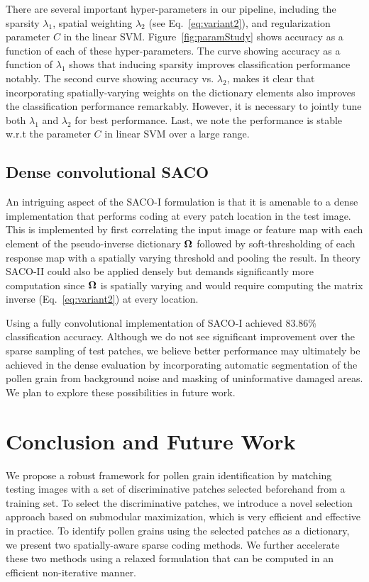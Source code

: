 \documentclass[10pt,twocolumn,letterpaper]{article}
\begin{document}
There are several important hyper-parameters in our pipeline, including the
sparsity $\lambda_1$, spatial weighting $\lambda_2$ (see
Eq.~\ref{eq:variant2}), and regularization parameter $C$ in the linear SVM.
Figure~\ref{fig:paramStudy} shows accuracy as a function of each of these
hyper-parameters.  The curve showing accuracy as a function of $\lambda_1$
shows that inducing sparsity improves classification performance notably.  The
second curve showing accuracy vs. $\lambda_2$, makes it clear that
incorporating spatially-varying weights on the dictionary elements also
improves the classification performance remarkably.  However, it is necessary
to jointly tune both $\lambda_1$ and $\lambda_2$ for best performance.  Last,
we note the performance is stable w.r.t the parameter $C$ in linear SVM over a
large range.

\subsection{Dense convolutional SACO}
An intriguing aspect of the SACO-I formulation is that it is amenable to a
dense implementation that performs coding at every patch location in the test
image.  This is implemented by first correlating the input image or feature map
with each element of the pseudo-inverse dictionary ${\bf \Omega}$ followed by
soft-thresholding of each response map with a spatially varying threshold and
pooling the result. In theory SACO-II could also be applied densely but demands
significantly more computation since ${\bf \Omega}$ is spatially varying and would
require computing the matrix inverse (Eq.~\ref{eq:variant2}) at every location.

Using a fully convolutional implementation of SACO-I achieved $83.86\%$
classification accuracy.  Although we do not see significant
improvement over the sparse sampling of test patches, we believe better
performance may ultimately be achieved in the dense evaluation by incorporating
automatic segmentation of the pollen grain from background noise and masking of
uninformative damaged areas.  We plan to explore these possibilities in
future work.

\section{Conclusion and Future Work}
We propose a robust framework for pollen grain identification by matching
testing images with a set of discriminative patches selected beforehand from a
training set.  To select the discriminative patches, we introduce a novel
selection approach based on submodular maximization, which is very efficient
and effective  in practice.  To identify pollen grains using the selected
patches as a dictionary, we present two spatially-aware sparse coding methods.
We further accelerate these two methods using a relaxed formulation that
can be computed in an efficient non-iterative manner.
\end{document}
